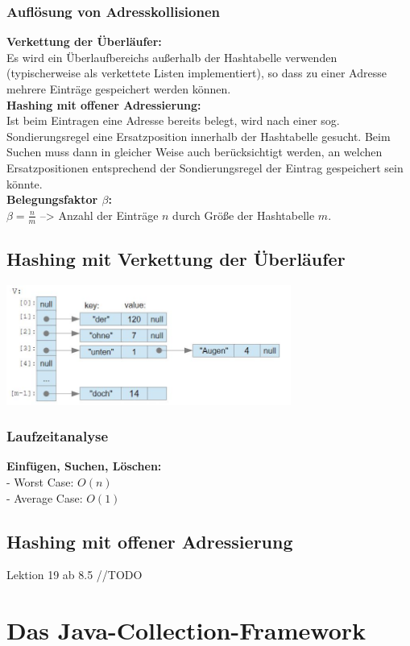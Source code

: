 \documentclass{scrreprt}
\newcommand\tab[1][1cm]{\hspace*{#1}}
\begin{document}
\subsection{Auflösung von Adresskollisionen}
\textbf{Verkettung der Überläufer:}
\\Es wird ein Überlaufbereichs außerhalb der Hashtabelle verwenden (typischerweise als verkettete Listen 
implementiert), so dass zu einer Adresse mehrere Einträge gespeichert werden können.
\\\textbf{Hashing mit offener Adressierung:}
\\Ist beim Eintragen eine Adresse bereits belegt, wird nach einer sog. Sondierungsregel eine Ersatzposition 
innerhalb der Hashtabelle gesucht. Beim Suchen muss dann in gleicher Weise auch
berücksichtigt werden, an welchen Ersatzpositionen entsprechend der Sondierungsregel der Eintrag gespeichert sein könnte.
\\\textbf{Belegungsfaktor $\beta$:}
\\\tab $\beta = \frac{n}{m}$ --> Anzahl der Einträge $n$ durch Größe der Hashtabelle $m$.
\section{Hashing mit Verkettung der Überläufer}
\includegraphics[width=0.7\textwidth]{graphics/verkettung}
\subsection{Laufzeitanalyse}
\textbf{Einfügen, Suchen, Löschen:}
\\- Worst Case: $O(n)$
\\- Average Case: $O(1)$
\section{Hashing mit offener Adressierung}
Lektion 19 ab 8.5 //TODO

\chapter{Das Java-Collection-Framework}
\end{document}
